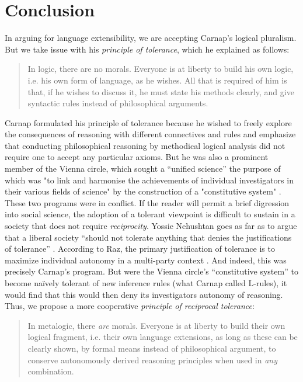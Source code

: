 \section{Conclusion}\label{conclusion}
In arguing for language extensibility, we are accepting Carnap's logical pluralism. But we take issue with his \emph{principle of tolerance}, which he explained as follows:
\begin{quote}
In logic, there are no morals. Everyone is at liberty to build his own logic, i.e. his own form of language, as he wishes. All that is required of him is that, if he wishes to discuss it, he must state his methods clearly, and give syntactic rules instead of philosophical arguments.
\end{quote}
Carnap formulated his principle of tolerance because he wished to freely explore the consequences of reasoning with different connectives and  rules and emphasize that conducting philosophical reasoning by methodical logical analysis did not require one to accept any particular axioms. But he was also a prominent member of the Vienna circle, which sought a ``unified science'' the purpose of which was "to link and harmonise the achievements of individual investigators in their various fields of science" by the construction of a "constitutive system" \cite{ViennaCircle}. These two programs were in conflict. If the reader will permit a brief digression into social science, the adoption of a tolerant viewpoint is difficult to sustain in a society that does not require \emph{reciprocity}. Yossie Nehushtan goes as far as to argue that a liberal  society ``should not tolerate anything that denies the justifications of tolerance'' \cite{Nehushtan}. According to Raz, the primary justification of tolerance is to maximize 
individual autonomy in a multi-party context \cite{Raz}. And indeed, this was precisely Carnap's program. But were the Vienna circle's ``constitutive system'' to become na\"ively tolerant of new inference rules (what Carnap called L-rules), it would find that this would then deny its investigators autonomy of reasoning. Thus, we propose a more cooperative \emph{principle of reciprocal tolerance}:
\begin{quote}
In metalogic, there \emph{are} morals. Everyone is at liberty to build their own logical fragment, i.e. their own language extensions, as long as these can be clearly shown, by formal means instead of philosophical argument, to conserve autonomously derived reasoning principles when used in \emph{any} combination.
\end{quote}

